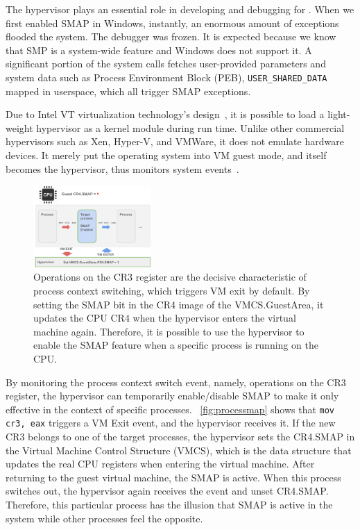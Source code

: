 The hypervisor plays an essential role in developing and debugging for \name. When we first enabled SMAP in Windows, instantly, an enormous amount of exceptions flooded the system. The debugger was frozen.  It is expected because we know that SMP is a system-wide feature and Windows does not support it. A significant portion of the system calls fetches user-provided parameters and system data such as Process Environment Block (PEB), \texttt{USER\_SHARED\_DATA} mapped in userspace, which all trigger SMAP exceptions.

Due to Intel VT virtualization technology's design~\cite{neiger2006intel}, it is possible to load a light-weight hypervisor as a kernel module during run time. Unlike other commercial hypervisors such as Xen, Hyper-V, and VMWare, it does not emulate hardware devices. It merely put the operating system into VM guest mode, and itself becomes the hypervisor, thus monitors system events~\cite{howtohide}.

\begin{figure}[th]
  \includegraphics[width=0.40\textwidth]{figures/processmap3}
  \centering
  \caption{Operations on the CR3 register are the decisive characteristic of process context switching, which triggers VM exit by default. By setting the SMAP bit in the CR4 image of the VMCS.GuestArea, it updates the CPU CR4 when the hypervisor enters the virtual machine again. Therefore, it is possible to use the hypervisor to enable the SMAP feature when a specific process is running on the CPU.}
  \label{fig:processmap}
\end{figure}


By monitoring the process context switch event, namely, operations on the CR3 register, the hypervisor can temporarily enable/disable SMAP to make it only effective in the context of specific processes. ~\autoref{fig:processmap} shows that \texttt{mov cr3, eax} triggers a VM Exit event, and the hypervisor receives it. If the new CR3 belongs to one of the target processes, the hypervisor sets the CR4.SMAP in the Virtual Machine Control Structure (VMCS), which is the data structure that updates the real CPU registers when entering the virtual machine. After returning to the guest virtual machine, the SMAP is active. When this process switches out, the hypervisor again receives the event and unset CR4.SMAP. Therefore, this particular process has the illusion that SMAP is active in the system while other processes feel the opposite.

